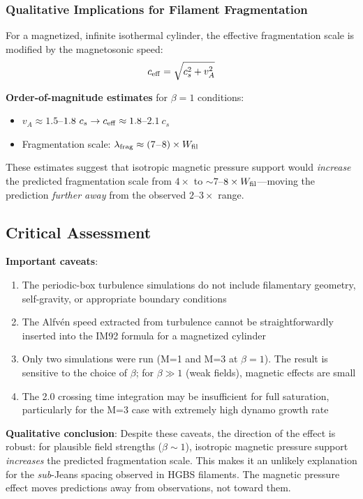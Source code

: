 \documentclass[11pt,a4paper]{article}
\begin{document}
\subsubsection{Qualitative Implications for Filament Fragmentation}

For a magnetized, infinite isothermal cylinder, the effective fragmentation scale is modified by the magnetosonic speed:
\begin{equation}
c_{\rm eff} = \sqrt{c_s^2 + v_A^2}
\end{equation}

\textbf{Order-of-magnitude estimates} for $\beta = 1$ conditions:
\begin{itemize}
    \item $v_A \approx 1.5$--$1.8~c_s \rightarrow c_{\rm eff} \approx 1.8$--$2.1~c_s$
    \item Fragmentation scale: $\lambda_{\rm frag} \approx (7$--$8) \times W_{\rm fil}$
\end{itemize}

These estimates suggest that isotropic magnetic pressure support would \textit{increase} the predicted fragmentation scale from $4\times$ to $\sim7$--$8\times W_{\rm fil}$—moving the prediction \textit{further away} from the observed $2$--$3\times$ range.

\subsection{Critical Assessment}

\textbf{Important caveats}:
\begin{enumerate}
    \item The periodic-box turbulence simulations do not include filamentary geometry, self-gravity, or appropriate boundary conditions
    \item The Alfv\'en speed extracted from turbulence cannot be straightforwardly inserted into the IM92 formula for a magnetized cylinder
    \item Only two simulations were run (M=1 and M=3 at $\beta=1$). The result is sensitive to the choice of $\beta$; for $\beta \gg 1$ (weak fields), magnetic effects are small
    \item The 2.0 crossing time integration may be insufficient for full saturation, particularly for the M=3 case with extremely high dynamo growth rate
\end{enumerate}

\textbf{Qualitative conclusion}: Despite these caveats, the direction of the effect is robust: for plausible field strengths ($\beta \sim 1$), isotropic magnetic pressure support \textit{increases} the predicted fragmentation scale. This makes it an unlikely explanation for the \textit{sub}-Jeans spacing observed in HGBS filaments. The magnetic pressure effect moves predictions away from observations, not toward them.
\end{document}
